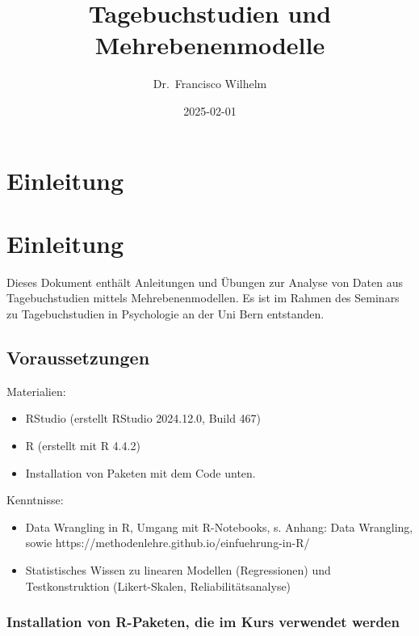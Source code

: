 \documentclass[
  letterpaper,
  DIV=11,
  numbers=noendperiod]{scrreprt}
\title{Tagebuchstudien und Mehrebenenmodelle}
\author{Dr.~Francisco Wilhelm}
\date{2025-02-01}
\providecommand{\tightlist}{%
  \setlength{\itemsep}{0pt}\setlength{\parskip}{0pt}}\usepackage{longtable,booktabs,array}
\renewcommand*\contentsname{Table of contents}
\newcommand\contentsname{Table of contents}
\begin{document}
\maketitle

\renewcommand*\contentsname{Table of contents}
{
\hypersetup{linkcolor=}
\setcounter{tocdepth}{2}
\tableofcontents
}


\chapter{Einleitung}\label{einleitung}


\chapter{Einleitung}\label{einleitung-1}

Dieses Dokument enthält Anleitungen und Übungen zur Analyse von Daten
aus Tagebuchstudien mittels Mehrebenenmodellen. Es ist im Rahmen des
Seminars zu Tagebuchstudien in Psychologie an der Uni Bern entstanden.

\section{Voraussetzungen}\label{voraussetzungen}

Materialien:

\begin{itemize}
\tightlist
\item
  RStudio (erstellt RStudio 2024.12.0, Build 467)
\item
  R (erstellt mit R 4.4.2)
\item
  Installation von Paketen mit dem Code unten.
\end{itemize}

Kenntnisse:

\begin{itemize}
\tightlist
\item
  Data Wrangling in R, Umgang mit R-Notebooks, s. Anhang: Data
  Wrangling, sowie https://methodenlehre.github.io/einfuehrung-in-R/
\item
  Statistisches Wissen zu linearen Modellen (Regressionen) und
  Testkonstruktion (Likert-Skalen, Reliabilitätsanalyse)
\end{itemize}

\subsection{Installation von R-Paketen, die im Kurs verwendet
werden}\label{installation-von-r-paketen-die-im-kurs-verwendet-werden}
\end{document}
